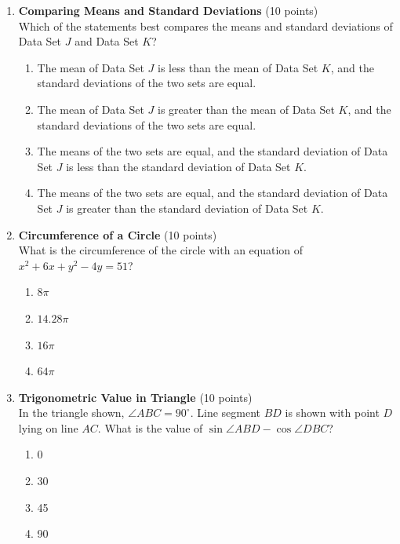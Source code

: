 \begin{enumerate}
  \item \textbf{Comparing Means and Standard Deviations} (10 points)\\
  Which of the statements best compares the means and standard deviations of Data Set $J$ and Data Set $K$?
  \begin{enumerate}[label=\Alph*.]
    \item The mean of Data Set $J$ is less than the mean of Data Set $K$, and the standard deviations of the two sets are equal.
    \item The mean of Data Set $J$ is greater than the mean of Data Set $K$, and the standard deviations of the two sets are equal.
    \item The means of the two sets are equal, and the standard deviation of Data Set $J$ is less than the standard deviation of Data Set $K$.
    \item The means of the two sets are equal, and the standard deviation of Data Set $J$ is greater than the standard deviation of Data Set $K$.
  \end{enumerate}
  \begin{subanswer}
  \end{subanswer}

  \newpage

  \item \textbf{Circumference of a Circle} (10 points)\\
  What is the circumference of the circle with an equation of $x^2+6x+y^2-4y=51$?
  \begin{enumerate}[label=\Alph*.]
    \item $8\pi$
    \item $14.28\pi$
    \item $16\pi$
    \item $64\pi$
  \end{enumerate}
  \begin{subanswer}
  \end{subanswer}

  \item \textbf{Trigonometric Value in Triangle} (10 points)\\
  In the triangle shown, $\angle ABC=90^\circ$. Line segment $BD$ is shown with point $D$ lying on line $AC$. What is the value of $\sin \angle ABD-\cos \angle DBC$?
  \begin{enumerate}[label=\Alph*.]
    \item 0
    \item 30
    \item 45
    \item 90
  \end{enumerate}
  \begin{subanswer}
  \end{subanswer}


\end{enumerate}
